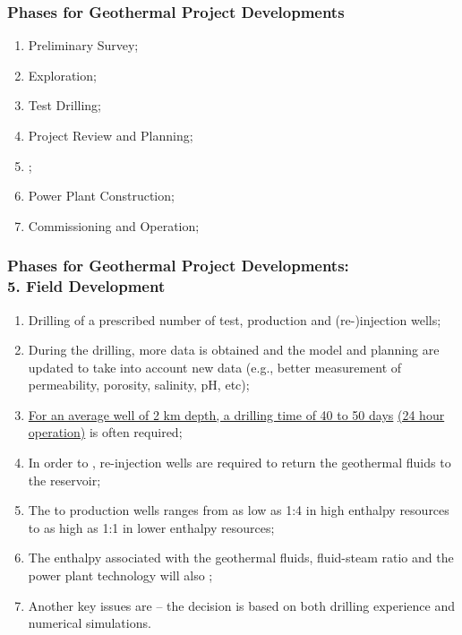 \documentclass[10pt,compress,unknownkeysallowed]{beamer}
\begin{document}
\begin{frame}
 \frametitle{Phases for Geothermal Project Developments} 
    \begin{enumerate}[1.]
       \item <1-> Preliminary Survey;
       \item <1-> Exploration; 
       \item <1-> Test Drilling;
       \item <1-> Project Review and Planning;
       \item <2-> ; 
       \item <1-> Power Plant Construction;
       \item <1-> Commissioning and Operation;
    \end{enumerate}
\end{frame}


\begin{frame}
 \frametitle{Phases for Geothermal Project Developments: \\ 5. Field Development }
    \begin{enumerate}[{5.}1]%
       \item <1-> Drilling of a prescribed number of test, production and (re-)injection wells;
       \item <2-> During the drilling, more data is obtained and the model and planning are updated to take into account new data (e.g., better measurement of permeability, porosity, salinity, pH, etc);
       \item <3-> \underline{For an average well of 2 km depth, a drilling time of 40 to 50 days} \underline{(24 hour operation)} is often required;
       \item <4-> In order to , re-injection wells are required to return the geothermal fluids to the reservoir; 
       \item <5-> The  to production wells ranges from as low as 1:4 in high enthalpy resources to as high as 1:1 in lower enthalpy resources; 
       \item <6-> The enthalpy associated with the geothermal fluids, fluid-steam ratio and the power plant technology will also ;
       \item <7-> Another key issues are  -- the decision is based on both drilling experience and numerical simulations.
    \end{enumerate}
\end{frame}
 
\end{document}
